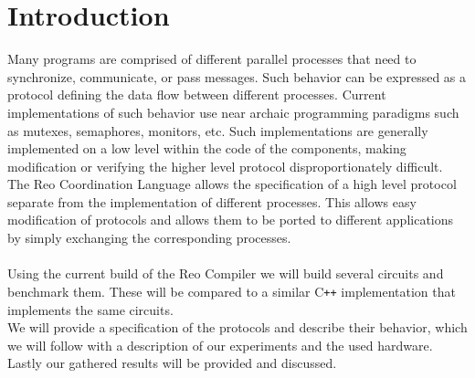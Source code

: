 \section{Introduction}
Many programs are comprised of different parallel processes that need to synchronize, communicate, or pass messages. Such behavior can be expressed as a protocol defining the data flow between different processes. Current implementations of such behavior use near archaic programming paradigms such as mutexes, semaphores, monitors, etc. Such implementations are generally implemented on a low level within the code of the components, making modification or verifying the higher level protocol disproportionately difficult.\\
The Reo Coordination Language \cite{reo} allows the specification of a high level protocol separate from the implementation of different processes. This allows easy modification of protocols and allows them to be ported to different applications by simply exchanging the corresponding processes. \\\\
%
Using the current build of the Reo Compiler \cite{reo:git} we will build several circuits and benchmark them. These will be compared to a similar C\texttt{++} implementation that implements the same circuits.\\
We will provide a specification of the protocols and describe their behavior, which we will follow with a description of our experiments and the used hardware. Lastly our gathered results will be provided and discussed.
